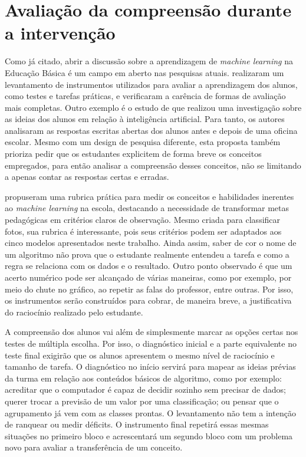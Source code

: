 \section{Avaliação da compreensão durante a intervenção}

Como já citado, abrir a discussão sobre a aprendizagem de \textit{machine learning} na Educação Básica é um campo em aberto nas pesquisas atuais.  realizaram um levantamento de instrumentos utilizados para avaliar a aprendizagem dos alunos, como testes e tarefas práticas, e verificaram a carência de formas de avaliação mais completas. Outro exemplo é o estudo de  que realizou uma investigação sobre as ideias dos alunos em relação à inteligência artificial. Para tanto, os autores analisaram as respostas escritas abertas dos alunos antes e depois de uma oficina escolar. Mesmo com um design de pesquisa diferente, esta proposta também prioriza pedir que os estudantes explicitem de forma breve os conceitos empregados, para então analisar a compreensão desses conceitos, não se limitando a apenas contar as respostas certas e erradas.

 propuseram uma rubrica prática para medir os conceitos e habilidades inerentes ao \textit{machine learning} na escola, destacando a necessidade de transformar metas pedagógicas em critérios claros de observação. Mesmo criada para classificar fotos, sua rubrica é interessante, pois seus critérios podem ser adaptados aos cinco modelos apresentados neste trabalho. Ainda assim, saber de cor o nome de um algoritmo não prova que o estudante realmente entendeu a tarefa e como a regra se relaciona com os dados e o resultado. Outro ponto observado é que um acerto numérico pode ser alcançado de várias maneiras, como por exemplo, por meio do chute no gráfico, ao repetir as falas do professor, entre outras. Por isso, os instrumentos serão construídos para cobrar, de maneira breve, a justificativa do raciocínio realizado pelo estudante.

A compreensão dos alunos vai além de simplesmente marcar as opções certas nos testes de múltipla escolha. Por isso, o diagnóstico inicial e a parte equivalente no teste final exigirão que os alunos apresentem o mesmo nível de raciocínio e tamanho de tarefa. O diagnóstico no início servirá para mapear as ideias prévias da turma em relação aos conteúdos básicos de algoritmo, como por exemplo: acreditar que o computador é capaz de decidir sozinho sem precisar de dados; querer trocar a previsão de um valor por uma classificação; ou pensar que o agrupamento já vem com as classes prontas. O levantamento não tem a intenção de ranquear ou medir déficits. O instrumento final repetirá essas mesmas situações no primeiro bloco e acrescentará um segundo bloco com um problema novo para avaliar a transferência de um conceito.

